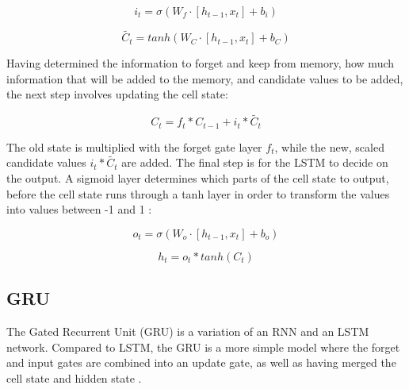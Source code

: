 \begin{equation}
i_{t} = \sigma(W_{f} \cdot[h_{t-1},x_{t}] + b_{i})
\end{equation}

\begin{equation}
\tilde{C_{t}} = tanh(W_{C} \cdot[h_{t-1},x_{t}] + b_{C})
\end{equation}

\indent\newline 
Having determined the information to forget and keep from memory, how much information that will be added to the memory, and candidate values to be added, the next step involves updating the cell state:

\begin{equation}
C_{t} = f_{t} \ast C_{t-1} + i_{t} \ast \tilde{C_{t}}
\end{equation}

\indent\newline 
The old state is multiplied with the forget gate layer $f_{t}$, while the new, scaled candidate values $i_{t}*\tilde{C_{t}}$ are added. The final step is for the LSTM to decide on the output. A sigmoid layer determines which parts of the cell state to output, before the cell state runs through a tanh layer in order to transform the values into values between -1 and 1 \cite{olah}: 

\begin{equation}
o_{t} = \sigma(W_{o} \cdot[h_{t-1},x_{t}] + b_{o})
\end{equation}

\begin{equation}
h_{t} = o_{t} * tanh(C_{t})
\end{equation}

\subsection{GRU}
The Gated Recurrent Unit (GRU) is a variation of an RNN and an LSTM network. Compared to LSTM, the GRU is a more simple model where the forget and input gates are combined into an update gate, as well as having merged the cell state and hidden state \cite{olah}. 

